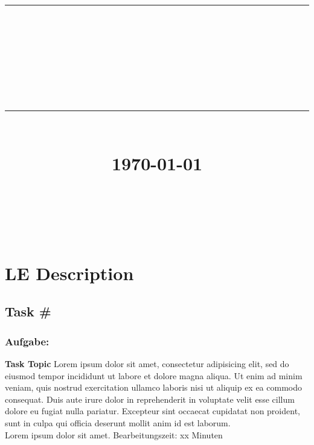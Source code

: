 \documentclass[12pt]{article}
\newcommand{\HRule}[1]{\rule{\linewidth}{#1}}
\begin{document}
\title{ \normalsize
		\HRule{0.5pt} \\
		\LARGE \textbf{\uppercase{\newCommandDiscipline}} \\
    \smallbreak
		\small\textbf{{\newCommandTerm}}\\
		\HRule{2pt} \\ [0.5cm]
		\normalsize \today \vspace*{10\baselineskip}}

\date{}

\author{
		\newCommandName \\
		\newCommandMatriculationNumber \\
		\newCommandUniversity \\
		\newCommandFaculty
}


\maketitle

\newpage



\sectionfont{\scshape}


\section{LE Description}

\subsection{Task \#}
\subsubsection*{Aufgabe:}

\begin{framed}
\textbf{Task Topic}
\smallbreak
Lorem ipsum dolor sit amet, consectetur adipisicing elit, sed do eiusmod tempor incididunt ut labore et dolore magna aliqua. Ut enim ad minim veniam, quis nostrud exercitation ullamco laboris nisi ut aliquip ex ea commodo consequat. Duis aute irure dolor in reprehenderit in voluptate velit esse cillum dolore eu fugiat nulla pariatur. Excepteur sint occaecat cupidatat non proident, sunt in culpa qui officia deserunt mollit anim id est laborum.
\\
Lorem ipsum dolor sit amet.
\bigbreak
\small Bearbeitungszeit: xx Minuten
\end{framed}
\bigbreak
\bigbreak
\end{document}
